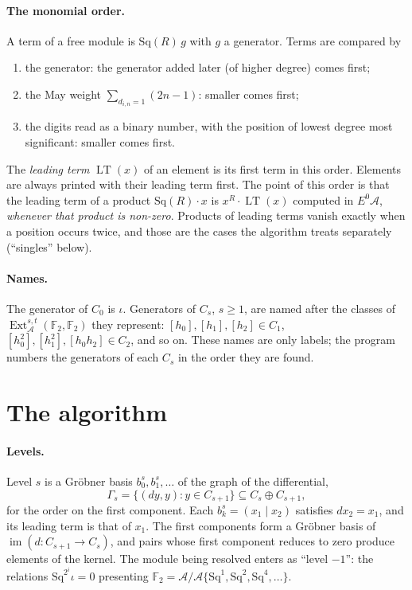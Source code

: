 \documentclass[11pt]{article}
\newcommand{\Sq}{\mathrm{Sq}}
\newcommand{\F}{\mathbb{F}_2}
\newcommand{\A}{\mathcal{A}}
\DeclareMathOperator{\LT}{LT}
\DeclareMathOperator{\Ext}{Ext}
\begin{document}
\paragraph{The monomial order.}
A term of a free module is $\Sq(R)\,g$ with $g$ a generator. Terms are compared by
\begin{enumerate}
\item the generator: the generator added later (of higher degree) comes first;
\item the May weight $\sum_{d_{i,n} = 1} (2n - 1)$: smaller comes first;
\item the digits read as a binary number, with the position of lowest degree most significant:
  smaller comes first.
\end{enumerate}
The \emph{leading term} $\LT(x)$ of an element is its first term in this order. Elements are
always printed with their leading term first. The point of this order is that the leading term
of a product $\Sq(R)\cdot x$ is $x^R \cdot \LT(x)$ computed in $E^0\A$, \emph{whenever that
product is non-zero}. Products of leading terms vanish exactly when a position occurs twice, and
those are the cases the algorithm treats separately (``singles'' below).

\paragraph{Names.}
The generator of $C_0$ is $\iota$. Generators of $C_s$, $s \ge 1$, are named after the classes of
$\Ext_\A^{s,t}(\F, \F)$ they represent: $[h_0], [h_1], [h_2] \in C_1$, $[h_0^2], [h_1^2],
[h_0h_2] \in C_2$, and so on. These names are only labels; the program numbers the generators of
each $C_s$ in the order they are found.

\section{The algorithm}

\paragraph{Levels.}
Level $s$ is a Gröbner basis $b^s_0, b^s_1, \dots$ of the graph of the differential,
\[ \Gamma_s = \{ (d y, y) : y \in C_{s+1} \} \subseteq C_s \oplus C_{s+1}, \]
for the order on the first component. Each $b^s_k = (x_1 \mid x_2)$ satisfies $d x_2 = x_1$,
and its leading term is that of $x_1$. The first components form a Gröbner basis of
$\operatorname{im}(d \colon C_{s+1} \to C_s)$, and pairs whose first component reduces to zero
produce elements of the kernel. The module being resolved enters as ``level $-1$'': the relations
$\Sq^{2^i}\iota = 0$ presenting $\F = \A/\A\{\Sq^1, \Sq^2, \Sq^4, \dots\}$.
\end{document}
